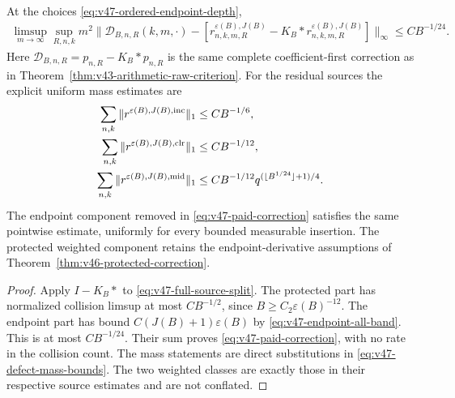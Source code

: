 \begin{theorem}
\label{thm:v47-ordered-boundary-removal}
At the choices \eqref{eq:v47-ordered-endpoint-depth},
\begin{align}
 \limsup_{m\to\infty}\sup_{R,n,k}m^2
 \bigl\|\mathscr D_{B,n,R}(k,m,\cdot)
       -[r^{\varepsilon(B),J(B)}_{n,k,m,R}
                 -K_B*r^{\varepsilon(B),J(B)}_{n,k,m,R}]\bigr\|_\infty
                                  \le C B^{-1/24}.
                                      \label{eq:v47-paid-correction}
\end{align}
Here $\mathscr D_{B,n,R}=p_{n,R}-K_B*p_{n,R}$ is the same complete
coefficient-first correction as in
Theorem~\ref{thm:v43-arithmetic-raw-criterion}.
For the residual sources the explicit uniform mass estimates are
\begin{align}
 \sum_{n,k}\|r^{\varepsilon(B),J(B),\mathrm{inc}}\|_1
       &\le C B^{-1/6},\notag\\
 \sum_{n,k}\|r^{\varepsilon(B),J(B),\mathrm{clr}}\|_1
       &\le C B^{-1/12},\notag\\
 \sum_{n,k}\|r^{\varepsilon(B),J(B),\mathrm{mid}}\|_1
       &\le C B^{-1/12}q^{(\lfloor B^{1/24}\rfloor+1)/4}.
                                      \label{eq:v47-ordered-residual-masses}
\end{align}
The endpoint component removed in
\eqref{eq:v47-paid-correction} satisfies the same pointwise estimate,
uniformly for every bounded measurable insertion. The protected
weighted component retains the endpoint-derivative assumptions of
Theorem~\ref{thm:v46-protected-correction}.
\end{theorem}
\begin{proof}
Apply $I-K_B*$ to \eqref{eq:v47-full-source-split}.
The protected part has normalized collision limsup at most
$CB^{-1/2}$, since $B\ge C_2\varepsilon(B)^{-12}$.
The endpoint part has bound $C(J(B)+1)\varepsilon(B)$ by
\eqref{eq:v47-endpoint-all-band}. This is at most $CB^{-1/24}$.
Their sum proves \eqref{eq:v47-paid-correction}, with no rate in the
collision count. The mass statements are direct substitutions in
\eqref{eq:v47-defect-mass-bounds}. The two weighted classes are exactly
those in their respective source estimates and are not conflated.
\end{proof}

